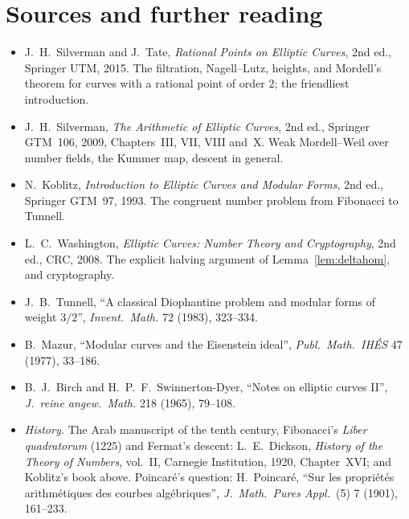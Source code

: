 \section*{Sources and further reading}

\begin{itemize}
\item J.~H.~Silverman and J.~Tate, \emph{Rational Points on Elliptic Curves}, 2nd ed., Springer UTM, 2015. The filtration, Nagell--Lutz, heights, and Mordell's
theorem for curves with a rational point of order $2$; the friendliest introduction.
\item J.~H.~Silverman, \emph{The Arithmetic of Elliptic Curves}, 2nd ed., Springer GTM~106, 2009, Chapters~III, VII, VIII and~X. Weak Mordell--Weil over number fields,
the Kummer map, descent in general.
\item N.~Koblitz, \emph{Introduction to Elliptic Curves and Modular Forms}, 2nd ed., Springer GTM~97, 1993. The congruent number problem from Fibonacci to Tunnell.
\item L.~C.~Washington, \emph{Elliptic Curves: Number Theory and Cryptography}, 2nd ed., CRC, 2008. The explicit halving argument of Lemma~\ref{lem:deltahom}, and
cryptography.
\item J.~B.~Tunnell, ``A classical Diophantine problem and modular forms of weight $3/2$'', \emph{Invent.\ Math.} 72 (1983), 323--334.
\item B.~Mazur, ``Modular curves and the Eisenstein ideal'', \emph{Publ.\ Math.\ IH\'ES} 47 (1977), 33--186.
\item B.~J.~Birch and H.~P.~F.~Swinnerton-Dyer, ``Notes on elliptic curves II'', \emph{J.\ reine angew.\ Math.} 218 (1965), 79--108.
\item \emph{History.} The Arab manuscript of the tenth century, Fibonacci's \emph{Liber quadratorum} (1225) and Fermat's
descent: L.~E.~Dickson, \emph{History of the Theory of Numbers}, vol.~II, Carnegie Institution, 1920, Chapter~XVI; and
Koblitz's book above. Poincar\'e's question: H.~Poincar\'e, ``Sur les propri\'et\'es arithm\'etiques des courbes
alg\'ebriques'', \emph{J.\ Math.\ Pures Appl.}\ (5) 7 (1901), 161--233.
\end{itemize}

